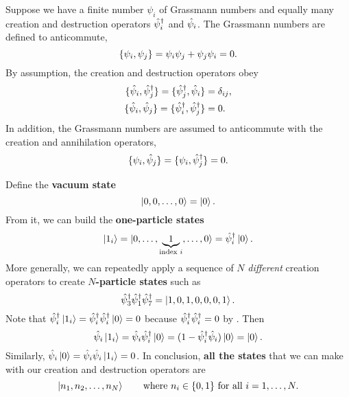 Suppose we have a finite number $\psi_i$ of Grassmann numbers and equally many creation and destruction operators $\hat\psi^\dagger_i$ and $\hat\psi_i$.
The Grassmann numbers are defined to anticommute,
\begin{equation}
	\{ \psi_i , \psi_j \} = \psi_i \psi_j + \psi_j \psi_i = 0 .
\end{equation}
By assumption, the creation and destruction operators obey
\begin{equation}
\begin{split}
	\{ \hat\psi_i , \hat\psi^\dagger_j \} = \{ \hat\psi^\dagger_j , \hat\psi_i \} &= \delta_{i j}, \\
	\{ \hat\psi_i , \hat\psi_j \} = \{ \hat\psi^\dagger_i , \hat\psi^\dagger_j \} &= 0 .
\end{split}
\end{equation}
In addition, the Grassmann numbers are assumed to anticommute with the creation and annihilation operators,
\begin{equation}
	\{ \psi_i , \hat\psi_j \} = \{ \psi_i , \hat\psi^\dagger_j \} = 0 .
\end{equation}

Define the \textbf{vacuum state}
\begin{equation}
	\ket{0, 0, \ldots, 0} = \ket{0}.  \\
\end{equation}
From it, we can build the \textbf{one-particle states}
\begin{equation}
	\ket{1_i} = \ket{0, \ldots, \underbrace{1}_{\text{index } i}, \ldots, 0} = \hat\psi^\dagger_i \ket{0} .
\end{equation}
More generally, we can repeatedly apply a sequence of $N$ \emph{different} creation operators to create \textbf{$N$-particle states} such as
\begin{equation}
	\hat\psi^\dagger_3 \hat\psi^\dagger_1 \hat\psi^\dagger_7 = \ket{1, 0, 1, 0, 0, 0, 1} .
\end{equation}
Note that $\hat\psi^\dagger_i \ket{1_i} = \hat\psi^\dagger_i \hat\psi^\dagger_i \ket{0} = 0$ because $\hat\psi^\dagger_i \hat\psi^\dagger_i = 0$ by .
Then
\begin{equation}
	\hat\psi_i \ket{1_i} = \hat\psi_i \hat\psi^\dagger_i \ket{0} = (1 - \hat\psi^\dagger_i \hat\psi_i) \ket{0} = \ket{0} .
\end{equation}
Similarly, $\hat\psi_i \ket{0} = \hat\psi_i \hat\psi_i \ket{1_i} = 0$.
In conclusion, \textbf{all the states} that we can make with our creation and destruction operators are
\begin{equation}
	\ket{n_1, n_2, \ldots, n_N} \qquad \text{where } n_i \in \{0, 1\} \text{ for all } i = 1, \ldots, N .
\end{equation}

